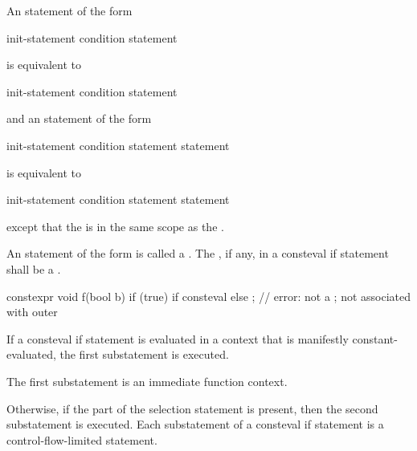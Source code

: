 \pnum
An  statement of the form
\begin{ncsimplebnf}
  \terminal{(} init-statement condition \terminal{)} statement
\end{ncsimplebnf}
is equivalent to
\begin{ncsimplebnf}
\terminal{\{}\br
\bnfindent init-statement\br
\bnfindent {}  \terminal{(} condition \terminal{)} statement\br
\terminal{\}}
\end{ncsimplebnf}
and an  statement of the form
\begin{ncsimplebnf}
  \terminal{(} init-statement condition \terminal{)} statement  statement
\end{ncsimplebnf}
is equivalent to
\begin{ncsimplebnf}
\terminal{\{}\br
\bnfindent init-statement\br
\bnfindent {}  \terminal{(} condition \terminal{)} statement  statement\br
\terminal{\}}
\end{ncsimplebnf}
except that the  is
in the same scope as the .

\pnum
An  statement of the form 
is called a .
The , if any, in a consteval if statement
shall be a .
\begin{example}
\begin{codeblock}
constexpr void f(bool b) {
  if (true)
    if consteval { }
    else ;              // error: not a ;  not associated with outer 
}
\end{codeblock}
\end{example}

\pnum
If a consteval if statement is evaluated in a context
that is manifestly constant-evaluated,
the first substatement is executed.
\begin{note}
The first substatement is an immediate function context.
\end{note}
Otherwise, if the  part of the selection statement is present,
then the second substatement is executed.
Each substatement of a consteval if statement is a control-flow-limited
statement.

